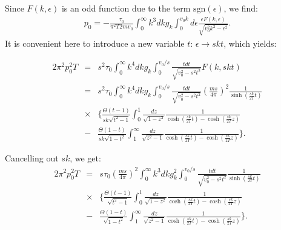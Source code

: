 %
Since $F(k,\epsilon)$ is an odd function due to the term $\mathrm{sgn}(\epsilon)$, we find:
%
\begin{eqnarray}
p_0
=
-\frac{\tau_0}{\pi^2T2mv_0}
\int_0^\infty k^3dkg_k\int_0^{v_0k} d\epsilon \frac{\epsilon F(k,\epsilon)}{\sqrt{v_0^2k^2-\epsilon^2}}.
\end{eqnarray}
%
It is convenient here to introduce a new variable $t$: $\epsilon\rightarrow skt$, which yields:
%
\begin{footnotesize}
\begin{eqnarray}
2\pi^2p_0^2T
&=&
s^2\tau_0
\int_0^\infty k^4dkg_k
\int_0^{v_0/s}
\frac{tdt}{\sqrt{v_0^2-s^2t^2}}
F(k,skt)\\
\nonumber
&=&
s^2\tau_0
\int_0^\infty k^4dkg_k
\int_0^{v_0/s}
\frac{tdt}{\sqrt{v_0^2-s^2t^2}}
\left(\frac{ms}{4\pi}\right)^2
\frac{1}{\sinh(\frac{sk}{2T}t)}\\ \nonumber
&\times& \Bigg\{
\frac{\Theta(t-1)}{sk\sqrt{t^2-1}}
\int_0^1\frac{dz}{\sqrt{1-z^2}}
\frac{1}{\cosh(\frac{sk}{2T}t)-\cosh(\frac{sk}{2T}z)}\\ \nonumber
&-& \frac{\Theta(1-t)}{sk\sqrt{1-t^2}}
\int_1^\infty \frac{dz}{\sqrt{z^2-1}}   \frac{1}{\cosh(\frac{sk}{2T}t)-\cosh(\frac{sk}{2T}z)}
\Bigg\}.
\end{eqnarray}
\end{footnotesize}
%
Cancelling out $sk$, we get:
%
\begin{eqnarray}
2\pi^2p_0^2T
&=&
s\tau_0
\left(\frac{ms}{4\pi}\right)^2
\int_0^\infty k^3dkg^2_k
\int_0^{v_0/s}
\frac{tdt}{\sqrt{v_0^2-s^2t^2}}
\frac{1}{\sinh(\frac{sk}{2T}t)} \\ \nonumber
&\times& \Big\{
\frac{\Theta(t-1)}{\sqrt{t^2-1}}
\int_0^1\frac{dz}{\sqrt{1-z^2}}
\frac{1}{\cosh(\frac{sk}{2T}t)-\cosh(\frac{sk}{2T}z)}\\ \nonumber
&-& \frac{\Theta(1-t)}{\sqrt{1-t^2}}
\int_1^\infty \frac{dz}{\sqrt{z^2-1}}   \frac{1}{\cosh(\frac{sk}{2T}t)-\cosh(\frac{sk}{2T}z)} \Big\}.\nonumber
\end{eqnarray}
%


